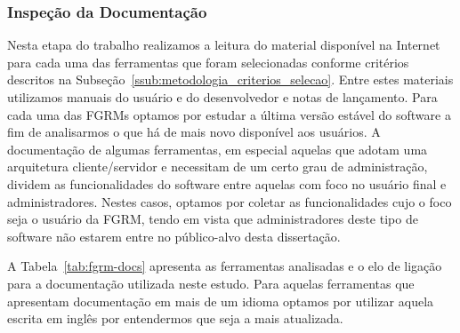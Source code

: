 \subsubsection{Inspeção da Documentação}
\label{subsec:inspecao_doumentacao}

Nesta etapa do trabalho realizamos a leitura do material disponível na Internet
para cada uma das ferramentas que foram selecionadas conforme critérios
descritos na Subseção~\ref{ssub:metodologia_criterios_selecao}. Entre estes
materiais utilizamos manuais do usuário e do desenvolvedor e notas de
lançamento. Para cada uma das FGRMs optamos por estudar a última versão estável
do software a fim de analisarmos o que há de mais novo disponível aos usuários.
A documentação de algumas ferramentas, em especial aquelas que adotam uma
arquitetura cliente/servidor e necessitam de um certo grau de administração,
dividem as funcionalidades do software entre aquelas com foco no usuário final e
ad\-mi\-nis\-tra\-do\-res. Nestes casos, optamos por coletar as funcionalidades
cujo o foco seja o usuário da FGRM, tendo em vista que administradores deste
tipo de software não estarem entre no público-alvo desta dissertação.

A Tabela~\ref{tab:fgrm-docs} apresenta as ferramentas analisadas e o elo de
ligação para a documentação utilizada neste estudo. Para aquelas ferramentas
que apresentam documentação em mais de um i\-di\-o\-ma optamos por utilizar
aquela escrita em inglês por entendermos que seja a mais atualizada.

